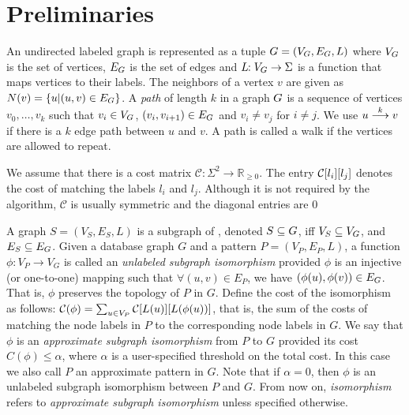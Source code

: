 \section{Preliminaries}

An undirected labeled graph \db is represented as a tuple $ \db =
(\vg,\eg,L) $ where $\vg$ is the set of vertices, $\eg$ is the set of
edges and $L\!\!: \vg \rightarrow \Sigma $ is a function that maps
vertices to their labels.  The neighbors of a vertex $v$ are given as $
N(v) = \{ u | (u,v) \in \eg \} $.  A
{\em path} of length $k$ in a graph $\db$ is a sequence of vertices $v_0,\ldots,v_k$
such that $v_i \in \vg$, $(v_i,v_{i+1}) \in \eg$ and $v_i \neq v_j$ for
$i \neq j$.
We use $\kpath{u}{v}{k}$ if there is a $k$ edge path
between $u$ and $v$.
A path is called a walk if the vertices
are allowed to repeat.

\smallskip{}
We assume that there is a cost matrix 
$\mathcal{C}\!\!:\Sigma^{2} \rightarrow \mathbb{R}_{\geq 0} $. 
The entry $\matij{C}{l_i}{l_j}$
denotes the cost of matching the labels $l_i$ and $l_j$. Although it is 
not required by the algorithm, $\mathcal{C}$ is usually symmetric and the diagonal
entries are $0$

\smallskip{}
A graph $S = (V_S,E_S,L)$ is a subgraph of \db, denoted $S \subseteq
\db$, iff $V_S \subseteq \vg$, and $E_S \subseteq \eg$.  Given a database
graph $G$ and a pattern $P = (V_P,E_P,L)$, a function $\phi\!\!: V_P \to
V_G$ is called an {\em unlabeled subgraph isomorphism} provided $\phi$
is an injective (or one-to-one) mapping such that $\forall (u,v) \in
E_P$, we have $(\phi(u),\phi(v)) \in \eg$. That is, $\phi$ preserves the
topology of $P$ in $G$. Define the cost of the isomorphism as follows:
$\mathcal{C}(\phi) = \sum_{u \in \vp} \matij{C}{L(u)}{L(\phi(u))}$, that is, the
sum of the costs of matching the node labels in $P$ to the corresponding
node labels in $G$.  We say that $\phi$ is an {\em approximate subgraph
isomorphism} from $P$ to $G$ provided its cost $C(\phi) \le \alpha$,
where $\alpha$ is a user-specified threshold on the total cost. In this
case we also call $P$ an approximate pattern in $G$. Note
that if $\alpha = 0$, then $\phi$ is an unlabeled subgraph isomorphism
between $P$ and $G$. From now on, \textit{isomorphism}
refers to \textit{approximate subgraph isomorphism} unless specified
otherwise.


